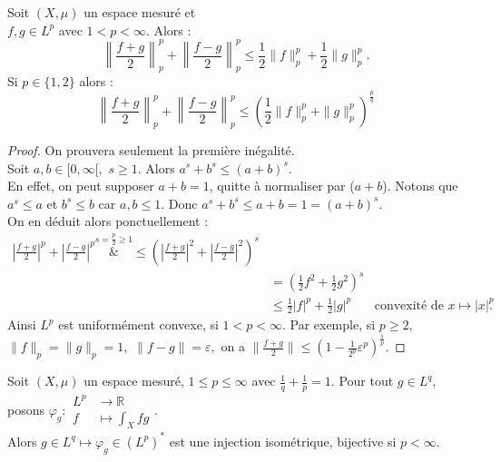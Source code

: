 \begin{propriete}
    Soit $(X, \mu)$ un espace mesuré et \\
    $f,g\in L^p$ avec $1<p<\infty .$ Alors :
    $$\left\|\frac{f+g}{2}\right\|_p^p+\left\|\frac{f-g}{2}\right\|^p_p\le \frac{1}{2}\|f\|_p^p+\frac{1}{2}\|g\|_p^p.$$
    Si $p\in \{1,2\} $ alors :
    $$\left\|\frac{f+g}{2}\right\|_p^p+\left\|\frac{f-g}{2}\right\|^p_p\le \left( \frac{1}{2}\|f\|^p_p +\|g\|^p_p\right)^{\frac{p}{q}}$$
\end{propriete}
\begin{proof}
    On prouvera seulement la première inégalité.\\
    Soit $a,b\in [0,\infty [,$ $s\ge 1.$ Alors $a^s+b^s\le \left( a+b \right) ^s.$\\
    En effet, on peut supposer $a+b=1$, quitte à normaliser par ($a+b$). Notons que $a^s\le a$ et $b^s\le b$ car $a,b\le 1.$ Donc $a^s+b^s\le a+b=1=(a+b)^s$.\\
    On en déduit alors ponctuellement :
    \begin{align*}
        |\frac{f+g}{2}| ^p+|\frac{f-g}{2}| ^p \overset{s=\frac{p}{2}\ge 1}&{\le} \left( |\frac{f+g}{2}|^2 + |\frac{f-g}{2}| ^2 \right) ^s\\
    &=\left( \frac{1}{2}f^2+\frac{1}{2}g^2 \right) ^s\\
    &\le \frac{1}{2}|f| ^p + \frac{1}{2}|g| ^p &\text{convexité de $x\mapsto |x| ^p$ }
    .\end{align*}
    Ainsi $L^p$ est uniformément convexe, si $1<p<\infty .$ Par exemple, si $p\ge 2,$ $\|f\|_p=\|g\|_p=1,$ $\|f-g\|=\varepsilon , $ on a $\|\frac{f+g}{2}\|\le \left( 1-\frac{1}{2^p}\varepsilon ^p \right) ^{\frac{1}{p}}.$
\end{proof}
\begin{theoreme}
    Soit $(X, \mu)$ un espace mesuré, $1\le p\le \infty $ avec $\frac{1}{q}+\frac{1}{p}=1.$ Pour tout $g\in L^q,$ \\
    posons $\varphi _g :\begin{aligned}
        L^p &\longrightarrow \mathbb{R}  \\
        f &\longmapsto \int_Xfg
    \end{aligned}$. \\
    Alors $g\in L^q\mapsto \varphi _g\in \left(L^p\right)^*$ est une injection isométrique, bijective si $p<\infty .$
\end{theoreme}
